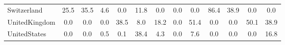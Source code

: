 \begin{table}[htbp]
\begin{tabular}{lcccccccccccc}
Switzerland &      25.5 &      35.5 &       4.6 &       0.0 &      11.8 &       0.0 &       0.0 &       0.0 &      86.4 &      38.9 &       0.0 &       0.0 \\  
UnitedKingdom &       0.0 &       0.0 &       0.0 &      38.5 &       8.0 &      18.2 &       0.0 &      51.4 &       0.0 &       0.0 &      50.1 &      38.9 \\  
UnitedStates &       0.0 &       0.0 &       0.5 &       0.1 &      38.4 &       4.3 &       0.0 &       7.6 &       0.0 &       0.0 &       0.0 &      16.8 \\  
\hline \hline \end{tabular}
\end{table}
